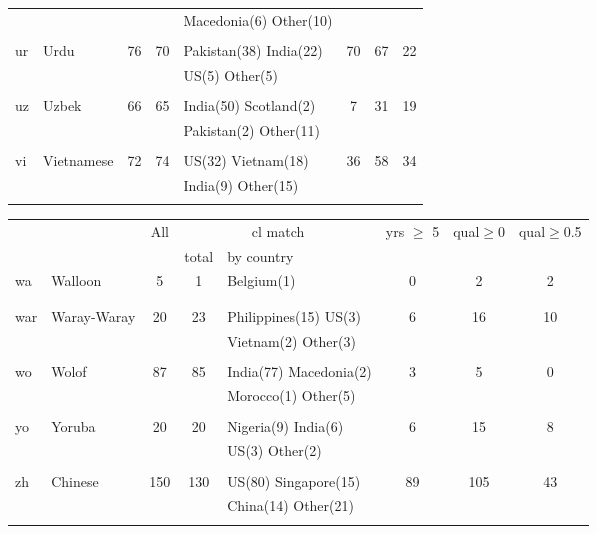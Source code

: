 \begin{figure}[h]
\begin{tabular}{llcclccc}
&&&&Macedonia(6) Other(10) &&&\\
&&&&&&&\\
ur&Urdu&76&70&Pakistan(38) India(22) &70&67&22\\
&&&&US(5) Other(5) &&&\\
&&&&&&&\\
uz&Uzbek&66&65&India(50) Scotland(2) &7&31&19\\
&&&&Pakistan(2) Other(11) &&&\\
&&&&&&&\\
vi&Vietnamese&72&74&US(32) Vietnam(18) &36&58&34\\
&&&&India(9) Other(15) &&&\\
&&&&&&&\\
\end{tabular}
\end{figure}
\clearpage
\begin{figure}[h]
\centering
\begin{tabular}{llcclccc}
&&All&\multicolumn{2}{c}{cl match}&yrs $\geq$ 5&qual$\geq$0&qual$\geq$0.5\\
&&&total&by country&&\\
\hline\hline
wa&Walloon&5&1&Belgium(1) &0&2&2\\
&&&&&&&\\
&&&&&&&\\
war&Waray-Waray&20&23&Philippines(15) US(3) &6&16&10\\
&&&&Vietnam(2) Other(3) &&&\\
&&&&&&&\\
wo&Wolof&87&85&India(77) Macedonia(2) &3&5&0\\
&&&&Morocco(1) Other(5) &&&\\
&&&&&&&\\
yo&Yoruba&20&20&Nigeria(9) India(6) &6&15&8\\
&&&&US(3) Other(2) &&&\\
&&&&&&&\\
zh&Chinese&150&130&US(80) Singapore(15) &89&105&43\\
&&&&China(14) Other(21) &&&\\
&&&&&&&\\
\hline\hline
\end{tabular}
\end{figure}
